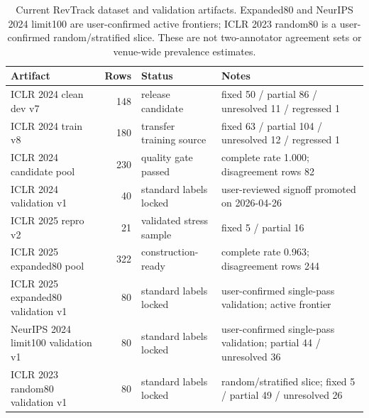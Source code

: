 \begin{table}[t]
\centering
\scriptsize
\setlength{\tabcolsep}{3pt}
\begin{tabular}{p{}rp{}p{}}
\toprule
Artifact & Rows & Status & Notes \\
\midrule
ICLR 2024 clean dev v7 & 148 & release candidate & fixed 50 / partial 86 / unresolved 11 / regressed 1 \\
ICLR 2024 train v8 & 180 & transfer training source & fixed 63 / partial 104 / unresolved 12 / regressed 1 \\
ICLR 2024 candidate pool & 230 & quality gate passed & complete rate 1.000; disagreement rows 82 \\
ICLR 2024 validation v1 & 40 & standard labels locked & user-reviewed signoff promoted on 2026-04-26 \\
ICLR 2025 repro v2 & 21 & validated stress sample & fixed 5 / partial 16 \\
ICLR 2025 expanded80 pool & 322 & construction-ready & complete rate 0.963; disagreement rows 244 \\
ICLR 2025 expanded80 validation v1 & 80 & standard labels locked & user-confirmed single-pass validation; active frontier \\
NeurIPS 2024 limit100 validation v1 & 80 & standard labels locked & user-confirmed single-pass validation; partial 44 / unresolved 36 \\
ICLR 2023 random80 validation v1 & 80 & standard labels locked & random/stratified slice; fixed 5 / partial 49 / unresolved 26 \\
\bottomrule
\end{tabular}
\caption{Current RevTrack dataset and validation artifacts. Expanded80 and NeurIPS 2024 limit100 are user-confirmed active frontiers; ICLR 2023 random80 is a user-confirmed random/stratified slice. These are not two-annotator agreement sets or venue-wide prevalence estimates.}
\label{tab:dataset-versions}
\end{table}
